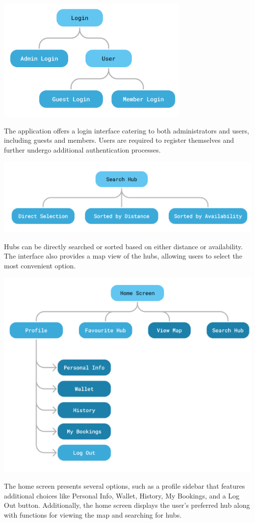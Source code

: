 \documentclass{scrreprt}
\begin{document}
\begin{center}
    \includegraphics*{login-interface.png}
\end{center}
The application offers a login interface catering to both administrators and users, including guests and members. Users are required to register themselves and further undergo additional authentication processes.

\begin{center}
    \includegraphics*{search-interface.png}
\end{center}
Hubs can be directly searched or sorted based on either distance or availability. The interface also provides a map view of the hubs, allowing users to select the most convenient option.

\begin{center}
    \includegraphics*[scale=0.75]{home-screen-interface.png}
\end{center}
The home screen presents several options, such as a profile sidebar that features additional choices like Personal Info, Wallet, History, My Bookings, and a Log Out button. Additionally, the home screen displays the user's preferred hub along with functions for viewing the map and searching for hubs.
\end{document}
